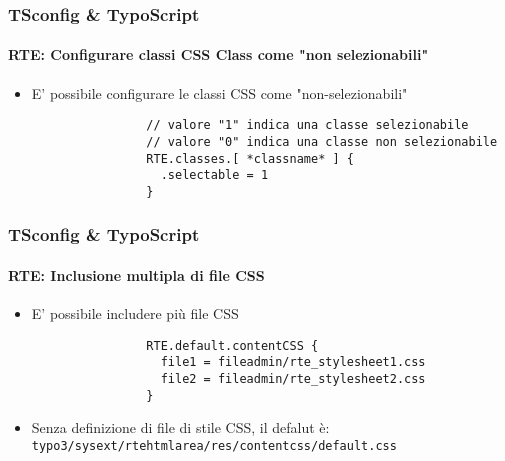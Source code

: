 
\begin{frame}[fragile]
	\frametitle{TSconfig \& TypoScript}
	\framesubtitle{RTE: Configurare classi CSS Class come "non selezionabili"}

	\begin{itemize}
		\item E' possibile configurare le classi CSS come "non-selezionabili"

			\begin{lstlisting}
				// valore "1" indica una classe selezionabile
				// valore "0" indica una classe non selezionabile
				RTE.classes.[ *classname* ] {
				  .selectable = 1
				}
			\end{lstlisting}

	\end{itemize}

\end{frame}


\begin{frame}[fragile]
	\frametitle{TSconfig \& TypoScript}
	\framesubtitle{RTE: Inclusione multipla di file CSS}

	\begin{itemize}
		\item E' possibile includere più file CSS

			\begin{lstlisting}
				RTE.default.contentCSS {
				  file1 = fileadmin/rte_stylesheet1.css
				  file2 = fileadmin/rte_stylesheet2.css
				}
			\end{lstlisting}

		\item Senza definizione di file di stile CSS, il defalut è:\newline
			\texttt{typo3/sysext/rtehtmlarea/res/contentcss/default.css}

	\end{itemize}

\end{frame}

